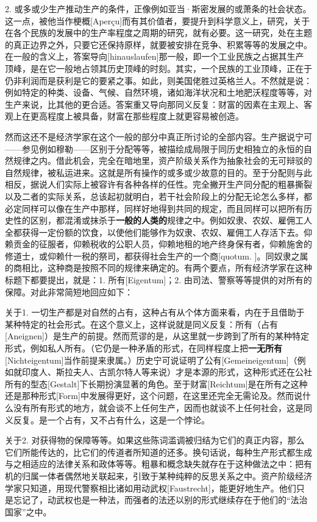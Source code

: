 \documentclass[a4paper,twoside,12pt]{ctexart}
\begin{document}
2. 或多或少生产推动生产的条件，正像例如亚当·斯密发展的或萧条的社会状态。这一点，被他当作梗概[Aperçu]而有其价值者，要提升到科学意义上，研究，关于在各个民族的发展中的生产率程度之周期的研究，就有必要。这一研究，处在主题的真正边界之外，只要它还保持原样，就要被安排在竞争、积累等等的发展之中。在一般的含义上，答案导向[hinauslaufen]那一般，即一个工业民族之占据其生产顶峰，是在它一般地占领其历史顶峰的时刻。其实，一个民族的工业顶峰，正在于仍非利润而是获利是它的要紧之事。如此，则美国佬胜过英格兰人。不然就是说：例如特定的种类、设备、气候、自然环境，诸如海洋状况和土地肥沃程度等等，对生产来说，比其他的更合适。答案重又导向那同义反复：财富的因素在主观上、客观上在更高程度上被具备，财富在那些程度上就更容易被创造。

然而这还不是经济学家在这个一般的部分中真正所讨论的全部内容。生产据说宁可——参见例如穆勒——区别于分配等等，被描绘成局限于同历史相独立的永恒的自然规律之内。借此机会，完全在暗地里，资产阶级关系作为抽象社会的无可辩驳的自然规律，被私运进来。这就是所有操作的或多或少故意的目的。至于分配则与此相反，据说人们实际上被容许有各种各样的任性。完全撇开生产同分配的粗暴撕裂以及二者的实际关系，总该起初就明白，若干社会阶段上的分配无论怎么多样，都必定同样可以像在生产中那样，同样好地得到共同的规定，而且同样可以把所有历史性的区别，都混淆或抹杀于\textbf{一般的人类的}规律之中。例如奴隶、农奴、雇佣工人全都获得一定份额的饮食，以使他们能够作为奴隶、农奴、雇佣工人存活下去。仰赖贡金的征服者，仰赖税收的公职人员，仰赖地租的地产终身保有者，仰赖施舍的修道士，或仰赖什一税的祭司，都获得社会生产的一个商[quotum. ]。同奴隶之属的商相比，这种商是按照不同的规律来确定的。有两个要点，所有经济学家在这种标题下都要提出，就是：1. 所有[Eigentum]；2. 由司法、警察等等提供的对所有的保障。对此非常简短地回应如下：

关于1. 一切生产都是对自然的占有，这种占有从个体方面来看，内在于且借助于某种特定的社会形式。在这个意义上，这样说就是同义反复：所有（占有[Aneignen]）是生产的前提。然而荒谬的是，从这里就一步跨到了所有的某种特定形式，例如私人所有。（它仍是一种矛盾的形式，在同样程度上把\textbf{一无所有}[Nichteigentum]当作前提来隶属。）历史宁可说证明了公有[Gemeineigentum]（例如就印度人、斯拉夫人、古凯尔特人等来说）才是本源的形式，这种形式还在公社所有的型态[Gestalt]下长期扮演显著的角色。至于财富[Reichtum]是在所有之这种还是那种形式[Form]中发展得更好，这个问题，在这里还完全无需论及。然而说什么没有所有形式的地方，就会谈不上任何生产，因而也就谈不上任何社会，这是同义反复。是一个占有，又不占有什么，这是一个悖论。

关于2. 对获得物的保障等等。如果这些陈词滥调被归结为它们的真正内容，那么它们所能传达的，比它们的传道者所知道的还多。换句话说，每种生产形式都生成与之相适应的法律关系和政体等等。粗暴和概念缺失就存在于这种做法之中：把有机的归属一体者偶然地关联起来，引致于某种纯粹的反思关系之中。资产阶级经济学家只知道，用现代警察相比诸如用动武权[Faustrecht]，能更好地生产。他们只是忘记了，动武权也是一种法，而强者的法还以别的形式继续存在于他们的“法治国家”之中。
\end{document}
